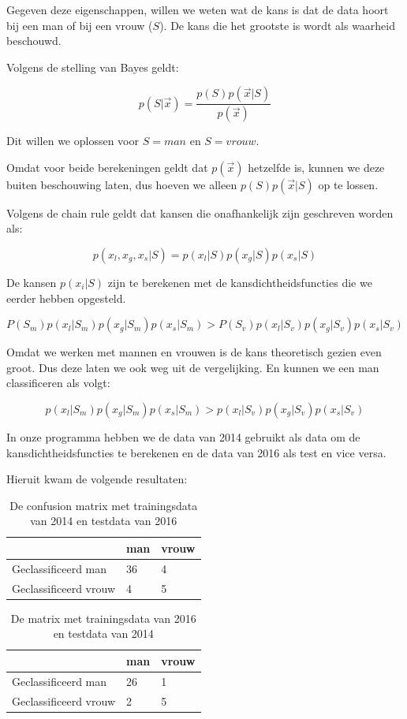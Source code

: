 \documentclass[a4paper,12px]{article}
\begin{document}
Gegeven deze eigenschappen, willen we weten wat de kans is dat de data hoort bij
een man of bij een vrouw ($S$). De kans die het grootste is wordt als waarheid
beschouwd.

Volgens de stelling van Bayes geldt:

$$ p(S|\vec x) = \frac{p(S)p(\vec x|S)}{p(\vec x)}$$

Dit willen we oplossen voor $S = man$ en $S = vrouw$.

Omdat voor beide berekeningen geldt dat $p(\vec x)$ hetzelfde is, kunnen we deze
buiten beschouwing laten, dus hoeven we alleen $p(S)p(\vec x|S)$ op te
lossen.

Volgens de chain rule geldt dat kansen die onafhankelijk zijn geschreven worden
als:

$$p(x_l, x_g, x_s|S) = p(x_l|S)p(x_g|S)p(x_s|S)$$

De kansen $p(x_i|S)$ zijn te berekenen met de kansdichtheidsfuncties die we
eerder hebben opgesteld.


$$P(S_m)p(x_l|S_m)p(x_g|S_m)p(x_s|S_m) > P(S_v)p(x_l|S_v)p(x_g|S_v)p(x_s|S_v)$$

Omdat we werken met mannen en vrouwen is de kans theoretisch gezien even groot.
Dus deze laten we ook weg uit de vergelijking. En kunnen we een man
classificeren als volgt:

$$p(x_l|S_m)p(x_g|S_m)p(x_s|S_m) > p(x_l|S_v)p(x_g|S_v)p(x_s|S_v)$$

In onze programma hebben we de data van 2014 gebruikt als data om de
kansdichtheidsfuncties te berekenen en de data van 2016 als test en vice versa.

Hieruit kwam de volgende resultaten:


\begin{table}[h]
\begin{tabular}{l|ll}
                      & man & vrouw \\\hline
Geclassificeerd man   & 36 & 4 \\
Geclassificeerd vrouw & 4  & 5 \\
\end{tabular}
\caption{De confusion matrix met trainingsdata van 2014 en testdata van 2016}
\end{table}


\begin{table}[h]
\begin{tabular}{l|ll}
                      & man & vrouw \\\hline
Geclassificeerd man   & 26 & 1 \\
Geclassificeerd vrouw & 2  & 5 \\
\end{tabular}
\caption{De matrix met trainingsdata van 2016 en testdata van 2014}
\end{table}




% 
% 
\end{document}
